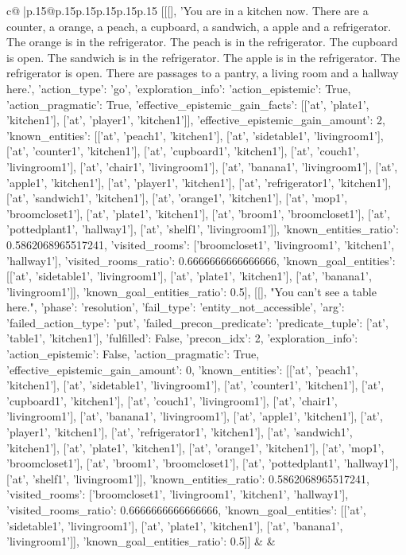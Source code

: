 \documentclass{article}
\begin{document}
{\begin{supertabular}{c@{$\;$}|p{.15\linewidth}@{}p{.15\linewidth}p{.15\linewidth}p{.15\linewidth}p{.15\linewidth}p{.15\linewidth}}
{{{	 [[[], 'You are in a kitchen now. There are a counter, a orange, a peach, a cupboard, a sandwich, a apple and a refrigerator. The orange is in the refrigerator. The peach is in the refrigerator. The cupboard is open. The sandwich is in the refrigerator. The apple is in the refrigerator. The refrigerator is open. There are passages to a pantry, a living room and a hallway here.', {'action_type': 'go', 'exploration_info': {'action_epistemic': True, 'action_pragmatic': True, 'effective_epistemic_gain_facts': [['at', 'plate1', 'kitchen1'], ['at', 'player1', 'kitchen1']], 'effective_epistemic_gain_amount': 2, 'known_entities': [['at', 'peach1', 'kitchen1'], ['at', 'sidetable1', 'livingroom1'], ['at', 'counter1', 'kitchen1'], ['at', 'cupboard1', 'kitchen1'], ['at', 'couch1', 'livingroom1'], ['at', 'chair1', 'livingroom1'], ['at', 'banana1', 'livingroom1'], ['at', 'apple1', 'kitchen1'], ['at', 'player1', 'kitchen1'], ['at', 'refrigerator1', 'kitchen1'], ['at', 'sandwich1', 'kitchen1'], ['at', 'orange1', 'kitchen1'], ['at', 'mop1', 'broomcloset1'], ['at', 'plate1', 'kitchen1'], ['at', 'broom1', 'broomcloset1'], ['at', 'pottedplant1', 'hallway1'], ['at', 'shelf1', 'livingroom1']], 'known_entities_ratio': 0.5862068965517241, 'visited_rooms': ['broomcloset1', 'livingroom1', 'kitchen1', 'hallway1'], 'visited_rooms_ratio': 0.6666666666666666, 'known_goal_entities': [['at', 'sidetable1', 'livingroom1'], ['at', 'plate1', 'kitchen1'], ['at', 'banana1', 'livingroom1']], 'known_goal_entities_ratio': 0.5}}], [[], "You can't see a table here.", {'phase': 'resolution', 'fail_type': 'entity_not_accessible', 'arg': {'failed_action_type': 'put', 'failed_precon_predicate': {'predicate_tuple': ['at', 'table1', 'kitchen1'], 'fulfilled': False, 'precon_idx': 2}}, 'exploration_info': {'action_epistemic': False, 'action_pragmatic': True, 'effective_epistemic_gain_amount': 0, 'known_entities': [['at', 'peach1', 'kitchen1'], ['at', 'sidetable1', 'livingroom1'], ['at', 'counter1', 'kitchen1'], ['at', 'cupboard1', 'kitchen1'], ['at', 'couch1', 'livingroom1'], ['at', 'chair1', 'livingroom1'], ['at', 'banana1', 'livingroom1'], ['at', 'apple1', 'kitchen1'], ['at', 'player1', 'kitchen1'], ['at', 'refrigerator1', 'kitchen1'], ['at', 'sandwich1', 'kitchen1'], ['at', 'plate1', 'kitchen1'], ['at', 'orange1', 'kitchen1'], ['at', 'mop1', 'broomcloset1'], ['at', 'broom1', 'broomcloset1'], ['at', 'pottedplant1', 'hallway1'], ['at', 'shelf1', 'livingroom1']], 'known_entities_ratio': 0.5862068965517241, 'visited_rooms': ['broomcloset1', 'livingroom1', 'kitchen1', 'hallway1'], 'visited_rooms_ratio': 0.6666666666666666, 'known_goal_entities': [['at', 'sidetable1', 'livingroom1'], ['at', 'plate1', 'kitchen1'], ['at', 'banana1', 'livingroom1']], 'known_goal_entities_ratio': 0.5}}]] 
	  } 
	   } 
	   } 
	 & & \\ 
 


\end{supertabular}}
\end{document}
